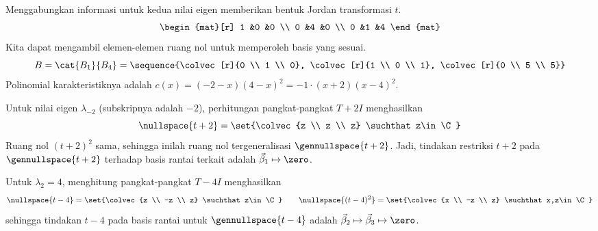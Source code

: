 \begin{exercises}
\begin{answer}
\begin{exparts}
            Menggabungkan informasi untuk kedua nilai eigen
            memberikan bentuk Jordan transformasi $t$.
            \begin{equation*}
              \begin{mat}[r]
                1  &0  &0  \\
                0  &4  &0  \\
                0  &1  &4
              \end{mat}
            \end{equation*}
            Kita dapat mengambil elemen-elemen ruang nol untuk memperoleh
            basis yang sesuai.
            \begin{equation*}
              B=\cat{B_{1}}{B_4}=
               \sequence{\colvec[r]{0 \\ 1 \\ 0},
                          \colvec[r]{1 \\ 0 \\ 1},
                          \colvec[r]{0 \\ 5 \\ 5}}
            \end{equation*}
        \partsitem Polinomial karakteristiknya adalah
            \( c(x)=(-2-x)(4-x)^2=-1\cdot (x+2)(x-4)^2 \).

            Untuk nilai eigen $\lambda_{-2}$
            (subskripnya adalah \( -2\)), perhitungan
            pangkat-pangkat $T+2I$ menghasilkan
            \begin{equation*}
              \nullspace{t+2}=\set{\colvec{z \\ z \\ z}
                                      \suchthat z\in\C}
            \end{equation*}
            Ruang nol $(t+2)^2$ sama, sehingga
            inilah ruang nol tergeneralisasi $\gennullspace{t+2}$.
            Jadi, tindakan restriksi $t+2$ pada
            $\gennullspace{t+2}$ terhadap basis
            rantai terkait adalah $\vec{\beta}_1\mapsto\zero$.

            Untuk $\lambda_2=4$,
            menghitung pangkat-pangkat $T-4I$ menghasilkan
            \begin{equation*}
              \nullspace{t-4}=\set{\colvec{z \\ -z \\ z}
                                      \suchthat z\in\C} 
              \qquad
              \nullspace{(t-4)^2}=\set{\colvec{x \\ -z \\ z}
                                           \suchthat x,z\in\C}
            \end{equation*}
            sehingga tindakan $t-4$ pada basis rantai untuk
            $\gennullspace{t-4}$ adalah
            $\vec{\beta}_2\mapsto\vec{\beta}_3\mapsto\zero$.


\end{exparts}
\end{answer}
\end{exercises}
